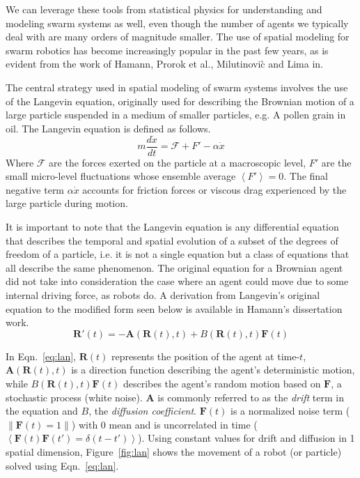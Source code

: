 \documentclass[11pt, onecolumn, compsoc, letterpaper]{article}
\newcommand{\norm}[1]{\lVert#1\rVert}
\newcommand{\V}[1]{\mathbf{#1}}
\begin{document}
We can leverage these tools from statistical physics for understanding and modeling swarm systems as well, even though the number of agents we typically deal with are many orders of magnitude smaller. The use of spatial modeling for swarm robotics has become increasingly popular in the past few years, as is evident from the work of Hamann\cite{Hamann2008, Hamann2010}, Prorok et al.\cite{Prorok2011}, Milutinovi\`{c} and Lima in\cite{Milutinovi2006}.

The central strategy used in spatial modeling of swarm systems involves the use of the Langevin equation, originally used for describing the Brownian motion of a large particle suspended in a medium of smaller particles, e.g. A pollen grain in oil. The Langevin equation is defined as follows\cite{Reif1965}.
\begin{equation}
	m \frac{d\dot{x}}{dt} = \mathcal{F} + F' - \alpha\dot{x}
\end{equation}
Where $\mathcal{F}$ are the forces exerted on the particle at a macroscopic level, $F'$ are the small micro-level fluctuations whose ensemble average $\left<F'\right> = 0$. The final negative term $\alpha\dot{x}$ accounts for friction forces or viscous drag experienced by the large particle during motion.

It is important to note that the Langevin equation is any differential equation that describes the temporal and spatial evolution of a subset of the degrees of freedom of a particle, i.e. it is not a single equation but a class of equations that all describe the same phenomenon. The original equation for a Brownian agent did not take into consideration the case where an agent could move due to some internal driving force, as robots do. A derivation from Langevin's original equation to the modified form seen below is available in Hamann's dissertation work\cite{Hamann2010}.
\begin{equation}\label{eq:lan}
\V{R}'(t) = -\V{A}(\V{R}(t),t) + B(\V{R}(t),t)\V{F}(t)
\end{equation}

In Eqn.~\eqref{eq:lan}, $\V{R}(t)$ represents the position of the agent at time-$t$, $\V{A}(\V{R}(t),t)$ is a direction function describing the agent's deterministic motion, while $B(\V{R}(t),t)\V{F}(t)$ describes the agent's random motion based on $\V{F}$, a stochastic process (white noise). $\V{A}$ is commonly referred to as the \emph{drift} term in the equation and $B$, the \emph{diffusion coefficient}. $\V{F}(t)$ is a normalized noise term ($\norm{\V{F}(t) = 1}$) with 0 mean and is uncorrelated in time ($\left<\V{F}(t)\V{F}(t') = \delta(t - t')\right>$). Using constant values for drift and diffusion in 1 spatial dimension, Figure~\ref{fig:lan} shows the movement of a robot (or particle) solved using Eqn.~\eqref{eq:lan}.
\end{document}
